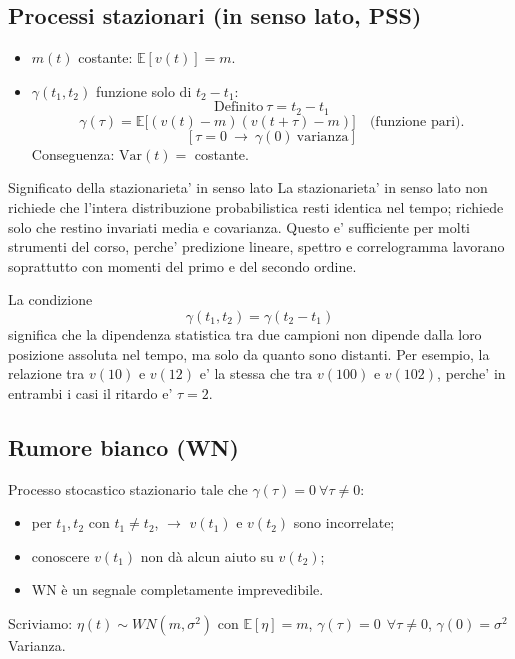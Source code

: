 \documentclass[11pt,a4paper]{article}
\begin{document}
\subsection{Processi stazionari (in senso lato, PSS)}
\begin{itemize}
  \item $m(t)$ costante: $\mathbb{E}[v(t)]=m$.
  \item $\gamma(t_1,t_2)$ funzione solo di $t_2-t_1$:
  \[
  \text{Definito} \ \tau=t_2-t_1
  \]
  \[\gamma(\tau)=\mathbb{E}\bigl[(v(t)-m)(v(t+\tau)-m)\bigr]\quad \text{(funzione pari).}\]
  \[
  [\tau = 0 \ \rightarrow \ \gamma(0)  \ \text{varianza}]
  \]
   Conseguenza: $\mathrm{Var}(t) =$ costante.
\end{itemize}

\begin{spiegazione}{Significato della stazionarieta' in senso lato}
La stazionarieta' in senso lato non richiede che l'intera distribuzione probabilistica resti identica nel tempo; richiede solo che restino invariati media e covarianza. Questo e' sufficiente per molti strumenti del corso, perche' predizione lineare, spettro e correlogramma lavorano soprattutto con momenti del primo e del secondo ordine.

La condizione
\[
\gamma(t_1,t_2)=\gamma(t_2-t_1)
\]
significa che la dipendenza statistica tra due campioni non dipende dalla loro posizione assoluta nel tempo, ma solo da quanto sono distanti. Per esempio, la relazione tra $v(10)$ e $v(12)$ e' la stessa che tra $v(100)$ e $v(102)$, perche' in entrambi i casi il ritardo e' $\tau=2$.
\end{spiegazione}

\subsection{Rumore bianco (WN)}
Processo stocastico stazionario tale che $\gamma(\tau)=0\ \forall \tau\neq0$:
\begin{itemize} 
  \item per $t_1, t_2$ con $t_1\neq t_2$, $\rightarrow$ $v(t_1)$ e $v(t_2)$ sono incorrelate;
  \item conoscere $v(t_1)$ non dà alcun aiuto su $v(t_2)$;
  \item WN è un segnale completamente imprevedibile.
\end{itemize}
Scriviamo: $\eta(t)\sim WN(m,\sigma^2)$ con $\mathbb{E}[\eta]=m$, $\gamma(\tau) = 0 \ \ \forall\tau\neq0$, $\gamma(0)=\sigma^2$ Varianza.
\end{document}
